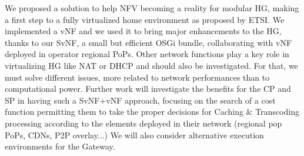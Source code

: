 We proposed a solution to help NFV becoming a reality for modular HG, making a first step to a fully virtualized home environment as proposed by ETSI.
We implemented a vNF and we used it to bring major enhancements to the HG, thanks to our SvNF, a small but efficient OSGi bundle, collaborating with vNF deployed in operator regional PoPs.
Other network functions play a key role in virtualizing HG like NAT or DHCP and should also be investigated.
For that, we must solve different issues, more related to network performances than to computational power. 
Further work will investigate the benefits for the CP and SP in having such a SvNF+vNF approach, focusing on the search of a cost function permitting them to take the proper decisions for Caching \& Transcoding processing according to the elements deployed in their network (regional pop PoPs, CDNs, P2P overlay...)
We will also consider alternative execution environments for the Gateway.


